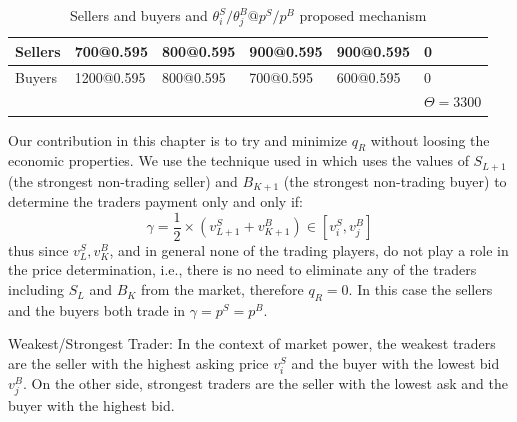 \begin{enumerate}
\begin{table}
\begin{subtable}[t]{\textwidth}
\end{subtable}
\endgroup

\centering
\begingroup
\setlength{\tabcolsep}{2pt} %
\renewcommand{\arraystretch}{1} %
\begin{subtable}[t]{\textwidth}
\centering
\vspace{0pt}
\begin{tabular}{|L{2cm}|C{2cm}|C{2cm}|C{2cm}|C{2cm}|L{1.8cm}|}
\hline
Sellers & 700@0.595  & 800@0.595 & 900@0.595 & 900@0.595 & 0 \\ \hline
Buyers  & 1200@0.595 & 800@0.595 & 700@0.595 & 600@0.595 & 0 \\ \hline
{} &  &  &  &  &$\Theta= 3300$ \\ 
\end{tabular}
\caption{Sellers and buyers and $\theta_i^S/\theta_j^B@p^S/p^B$ proposed mechanism}
\label{tbl:sd:PROPOSED}
\end{subtable}
\endgroup
\label{tbl:sd}
\end{table}
\endgroup

Our contribution in this chapter is to try and minimize $q^{}_R$ without loosing the economic properties. We use the technique used in \cite{MCAFEE1992434} which uses the values of $S_{L+1}$ (the strongest non-trading seller) and $B_{K+1}$ (the strongest non-trading buyer) to determine the traders payment only and only if:
\begin{equation}
\gamma = {\frac{1}{2}}\times({v_{{L+1}}^{S}+v_{{K+1}}^B}) \in [v_{i}^{S},v_{j}^{{B}}]
\end{equation}
thus since $v_L^S, v_K^B$, and in general none of the trading players, do not play a role in the price determination, i.e., there is no need to eliminate any of the traders including $S_{L}$ and $B_{K}$ from the market, therefore $q^{}_R = 0$. In this case the sellers and the buyers both trade in $\gamma=p^S=p^B$.


\begin{Definition}
Weakest/Strongest Trader:
In the context of market power, the weakest traders are the seller with the highest asking price $v_{i}^S$ and the buyer with the lowest bid $v_{j}^{B}$. On the other side, strongest traders are the seller with the lowest ask and the buyer with the highest bid.
\end{Definition}


\end{enumerate}
